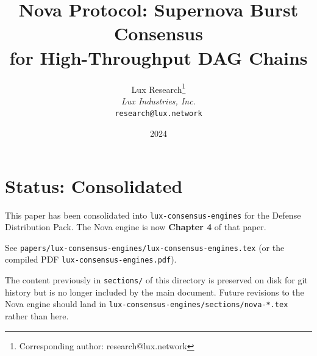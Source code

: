 \documentclass[11pt,a4paper]{article}
\title{\textbf{Nova Protocol: Supernova Burst Consensus\\for High-Throughput DAG Chains}}
\author{
Lux Research\thanks{Corresponding author: research@lux.network}\\
\textit{Lux Industries, Inc.}\\
\texttt{research@lux.network}
}
\date{2024}
\begin{document}
\luxcoverpage

\section*{Status: Consolidated}

This paper has been consolidated into \texttt{lux-consensus-engines} for the
Defense Distribution Pack. The Nova engine is now \textbf{Chapter 4} of that paper.

See \texttt{papers/lux-consensus-engines/lux-consensus-engines.tex} (or the
compiled PDF \texttt{lux-consensus-engines.pdf}).

The content previously in \texttt{sections/} of this directory is preserved on
disk for git history but is no longer included by the main document. Future
revisions to the Nova engine should land in
\texttt{lux-consensus-engines/sections/nova-*.tex} rather than here.
\end{document}
